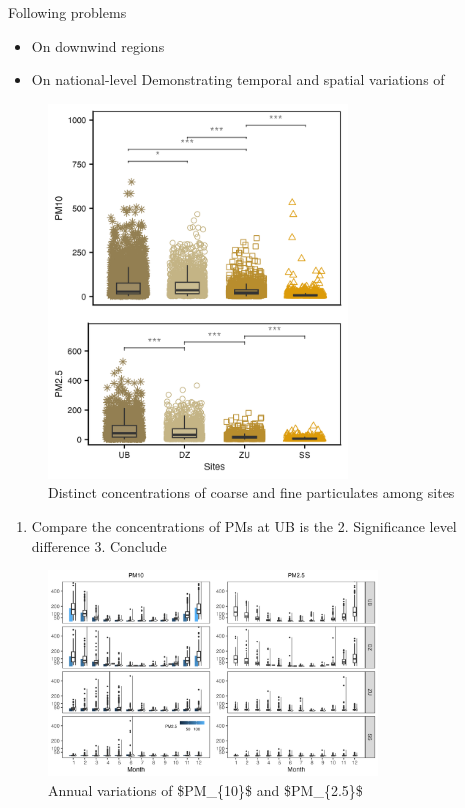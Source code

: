 \documentclass[
  11pt,
]{article}
\providecommand{\tightlist}{%
  \setlength{\itemsep}{0pt}\setlength{\parskip}{0pt}}
\begin{document}
Following problems

\begin{itemize}
\tightlist
\item
  On downwind regions
\item
  On national-level Demonstrating temporal and spatial variations of
\end{itemize}

\newpage

\begin{figure}
\centering
\includegraphics[width=3.125in,height=\textheight,keepaspectratio]{images/figure_3.png}
\caption{Distinct concentrations of coarse and fine particulates among
sites}
\end{figure}

\begin{enumerate}
\def\labelenumi{\arabic{enumi}.}
\tightlist
\item
  Compare the concentrations of PMs at UB is the 2. Significance level
  difference 3. Conclude
\end{enumerate}

\newpage

\begin{figure}
\centering
\includegraphics[width=3.4375in,height=\textheight,keepaspectratio]{images/figure_4.png}
\caption{Annual variations of \$PM\_\{10\}\$ and \$PM\_\{2.5\}\$}
\end{figure}
\end{document}

